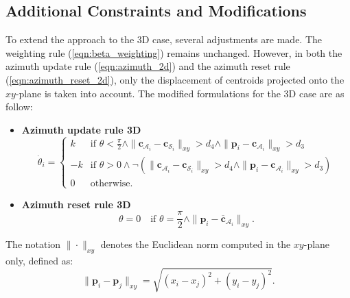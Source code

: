     \subsection{Additional Constraints and Modifications}
        To extend the approach to the 3D case, several adjustments are made.
        The weighting rule (\ref{eqn:beta_weighting}) remains unchanged. 
        However, in both the azimuth update rule (\ref{eqn:azimuth_2d}) and the azimuth reset rule (\ref{eqn:azimuth_reset_2d}), only the displacement of centroids projected onto the $xy$-plane is taken into account.
        The modified formulations for the 3D case are as follow:
        \begin{itemize}
            \item \textbf{Azimuth update rule 3D}
                \begin{equation}
                    \label{eqn:azimuth_3d}
                    \dot{\theta}_i = 
                    \begin{cases}
                        k  & \text{if } \theta < \frac{\pi}{2} \land \|\mathbf{c}_{\mathcal{A}_i} - \mathbf{c}_{\mathcal{S}_i}\|_{xy} > d_4 \land \|\mathbf{p}_i - \mathbf{c}_{\mathcal{A}_i}\|_{xy} > d_3 \\
                        -k & \text{if } \theta > 0 \land \neg (\|\mathbf{c}_{\mathcal{A}_i} - \mathbf{c}_{\mathcal{S}_i}\|_{xy} > d_4 \land \|\mathbf{p}_i - \mathbf{c}_{\mathcal{A}_i}\|_{xy} > d_3) \\
                        0  & \text{otherwise} \text{.}
                    \end{cases}
                \end{equation}
            \item \textbf{Azimuth reset rule 3D}
                \begin{equation}
                    \label{eqn:azimuth_reset_3d}
                    \theta = 0 \quad \text{if } \theta = \frac{\pi}{2} \land \| \mathbf{p}_i - \mathbf{\overline{c}}_{\mathcal{A}_i} \|_{xy}\text{.}
                \end{equation}
        \end{itemize}

        The notation $\| \cdot \|_{xy}$ denotes the Euclidean norm computed in the $xy$-plane only, defined as:
        \begin{equation}
            \| \mathbf{p}_i - \mathbf{p}_j \|_{xy} = \sqrt{(x_i - x_j)^2 + (y_i - y_j)^2}\text{.}
        \end{equation}

